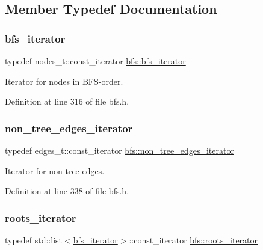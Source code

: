 \subsection{Member Typedef Documentation}
\mbox{\label{classbfs_a1035f068a96de0370789ec315aef4f73}} 
\subsubsection{\texorpdfstring{bfs\+\_\+iterator}{bfs\_iterator}}
{\footnotesize\ttfamily typedef nodes\+\_\+t\+::const\+\_\+iterator \mbox{\hyperlink{classbfs_a1035f068a96de0370789ec315aef4f73}{bfs\+::bfs\+\_\+iterator}}\hspace{0.3cm}{\ttfamily [inherited]}}



Iterator for nodes in B\+F\+S-\/order. 



Definition at line 316 of file bfs.\+h.

\mbox{\label{classbfs_a89ec32919076618d9eef18990fef543f}} 
\subsubsection{\texorpdfstring{non\+\_\+tree\+\_\+edges\+\_\+iterator}{non\_tree\_edges\_iterator}}
{\footnotesize\ttfamily typedef edges\+\_\+t\+::const\+\_\+iterator \mbox{\hyperlink{classbfs_a89ec32919076618d9eef18990fef543f}{bfs\+::non\+\_\+tree\+\_\+edges\+\_\+iterator}}\hspace{0.3cm}{\ttfamily [inherited]}}



Iterator for non-\/tree-\/edges. 



Definition at line 338 of file bfs.\+h.

\mbox{\label{classbfs_a70b915179053a2993154614d4358fdc1}} 
\subsubsection{\texorpdfstring{roots\+\_\+iterator}{roots\_iterator}}
{\footnotesize\ttfamily typedef std\+::list$<$\mbox{\hyperlink{classbfs_a1035f068a96de0370789ec315aef4f73}{bfs\+\_\+iterator}}$>$\+::const\+\_\+iterator \mbox{\hyperlink{classbfs_a70b915179053a2993154614d4358fdc1}{bfs\+::roots\+\_\+iterator}}\hspace{0.3cm}{\ttfamily [inherited]}}



